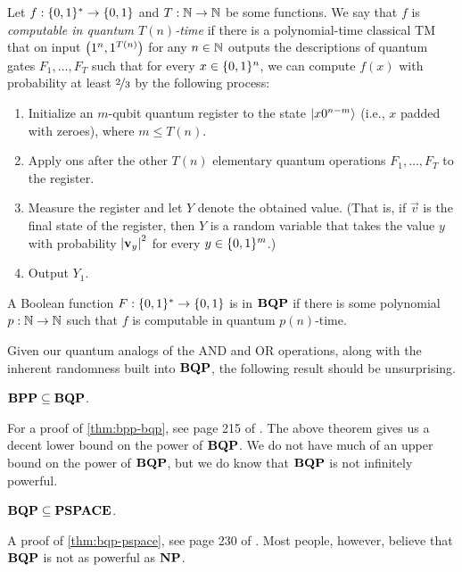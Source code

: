 \documentclass[12pt]{article}
\begin{document}
\begin{defn}
  \label{defn:bqp}
  Let $f : \zo^* \to \zo$ and $T : \NN \to \NN$ be some functions. We say that
  $f$ is \emph{computable in quantum $T(n)$-time} if there is a polynomial-time
  classical TM that on input $\paren*{1^n, 1^{T(n)}}$ for any $n \in \NN$
  outputs the descriptions of quantum gates $F_1, \dots, F_T$ such that for
  every $x\in \zo^n$, we can compute $f(x)$ with probability at least
  $\nfrac{2}{3}$ by the following process:
  \begin{enumerate}
    \item Initialize an $m$-qubit quantum register to the state
      $\reg*{x0^{n-m}}$ (i.e., $x$ padded with zeroes), where $m \le T(n)$.
    \item Apply ons after the other $T(n)$ elementary quantum operations $F_1,
      \dots, F_T$ to the register.
    \item Measure the register and let $Y$ denote the obtained value. (That is,
      if $\vec{v}$ is the final state of the register, then $Y$ is a random
      variable that takes the value $y$ with probability $\abs*{\vec{v}_y}^2$
      for every $y \in \zo^m$.)
    \item Output $Y_1$.
  \end{enumerate}
  A Boolean function $F : \zo^* \to \zo$ is in $\BQP$ if there is some
  polynomial $p : \NN \to \NN$ such that $f$ is computable in quantum
  $p(n)$-time.
\end{defn}

Given our quantum analogs of the AND and OR operations, along with the inherent
randomness built into $\BQP$, the following result should be unsurprising.

\begin{thm}
  \label{thm:bpp-bqp}
  $\BPP \subseteq \BQP$.
\end{thm}

For a proof of \cref{thm:bpp-bqp}, see page 215 of \cite{AB09}. The above
theorem gives us a decent lower bound on the power of $\BQP$. We do not have
much of an upper bound on the power of $\BQP$, but we do know that $\BQP$ is not
infinitely powerful.

\begin{thm}
  \label{thm:bqp-pspace}
  $\BQP \subseteq \PSPACE$.
\end{thm}

A proof of \cref{thm:bqp-pspace}, see page 230 of \cite{AB09}. Most people,
however, believe that $\BQP$ is not as powerful as $\NP$.
\end{document}

